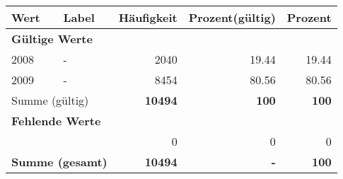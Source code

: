      \begin{longtable}{lXrrr}
     \toprule
     \textbf{Wert} & \textbf{Label} & \textbf{Häufigkeit} & \textbf{Prozent(gültig)} & \textbf{Prozent} \\
     \endhead
     \midrule
     \multicolumn{5}{l}{\textbf{Gültige Werte}}\\

     2008 &
     \multicolumn{1}{X}{ -  } &


       \num{2040} &
       \num[round-mode=places,round-precision=2]{19.44} &
         \num[round-mode=places,round-precision=2]{19.44} \\

     2009 &
     \multicolumn{1}{X}{ -  } &


       \num{8454} &
       \num[round-mode=places,round-precision=2]{80.56} &
         \num[round-mode=places,round-precision=2]{80.56} \\
     \midrule
     \multicolumn{2}{l}{Summe (gültig)} &
       \textbf{\num{10494}} &
     \textbf{\num{100}} &
       \textbf{\num[round-mode=places,round-precision=2]{100}} \\
     \multicolumn{5}{l}{\textbf{Fehlende Werte}}\\
      & & 0 & 0 & 0 \\
     \midrule
     \multicolumn{2}{l}{\textbf{Summe (gesamt)}} &
          \textbf{\num{10494}} &
        \textbf{-} &
        \textbf{\num{100}} \\
     \bottomrule
     \end{longtable}
     
